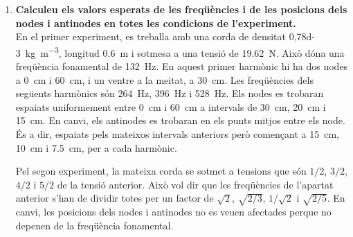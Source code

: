 \documentclass[12pt, a4paper]{article}
\begin{document}
\begin{enumerate}
\item \textbf{Calculeu els valors esperats de les freqüències i de les posicions dels nodes i antinodes en totes les condicions de l'experiment.} \\
	\indent En el primer experiment, es treballa amb una corda de densitat \SI{0,78d-3}{kg.m^{-3}}, longitud \SI{0,6}{m} i sotmesa a una tensió de \SI{19,62}{N}. Això dóna una freqüència fonamental de \SI{132}{Hz}. En aquest primer harmònic hi ha dos nodes a \SI{0}{cm} i \SI{60}{cm}, i un ventre a la meitat, a \SI{30}{cm}. Les freqüències dels següents harmònics són \SI{264}{Hz}, \SI{396}{Hz} i \SI{528}{Hz}. Els nodes es trobaran espaiats uniformement entre \SI{0}{cm} i \SI{60}{cm} a intervals de \SI{30}{cm}, \SI{20}{cm} i \SI{15}{cm}. En canvi, els antinodes es trobaran en els punts mitjos entre els node. És a dir, espaiats pels mateixos intervals anteriors però començant a \SI{15}{cm}, \SI{10}{cm} i \SI{7,5}{cm}, per a cada harmònic.

Pel segon experiment, la mateixa corda se sotmet a tensions que són \( 1/2 \), \( 3/2 \), \( 4/2 \) i \( 5/2 \) de la tensió anterior. Això vol dir que les freqüències de l'apartat anterior s'han de dividir totes per un factor de \( \sqrt{2} \), \( \sqrt{2/3} \), \( 1/\sqrt{2} \) i \( \sqrt{2/5} \). En canvi, les posicions dels nodes i antinodes no es veuen afectades perque no depenen de la freqüència fonamental.

\end{enumerate}
\end{document}
